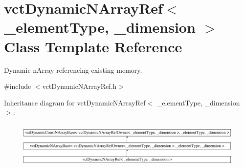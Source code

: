 \hypertarget{classvct_dynamic_n_array_ref}{\section{vct\-Dynamic\-N\-Array\-Ref$<$ \-\_\-element\-Type, \-\_\-dimension $>$ Class Template Reference}
\label{classvct_dynamic_n_array_ref}
}


Dynamic n\-Array referencing existing memory.  




{\ttfamily \#include $<$vct\-Dynamic\-N\-Array\-Ref.\-h$>$}

Inheritance diagram for vct\-Dynamic\-N\-Array\-Ref$<$ \-\_\-element\-Type, \-\_\-dimension $>$\-:\begin{figure}[H]
\begin{center}
\leavevmode
\includegraphics[height=2.366197cm]{d0/d43/classvct_dynamic_n_array_ref}
\end{center}
\end{figure}
